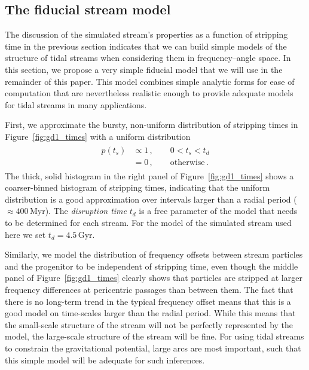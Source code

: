 \documentclass[12pt,preprint]{aastex}
\renewcommand{\figurename}{Figure}
\newcommand{\Myr}{\ensuremath{\,\mathrm{Myr}}}
\newcommand{\Gyr}{\ensuremath{\,\mathrm{Gyr}}}
\newcommand{\ts}{\ensuremath{t_s}}
\begin{document}
\subsection{The fiducial stream model}\label{sec:fidmodel}

The discussion of the simulated stream's properties as a function of
stripping time in the previous section indicates that we can build
simple models of the structure of tidal streams when considering them
in frequency--angle space. In this section, we propose a very simple
fiducial model that we will use in the remainder of this paper. This
model combines simple analytic forms for ease of computation that are
nevertheless realistic enough to provide adequate models for tidal
streams in many applications.

First, we approximate the bursty, non-uniform distribution of
stripping times in \figurename~\ref{fig:gd1_times} with a uniform
distribution
\begin{align}\label{eq:pt}
  \begin{split}
    p(\ts) & \propto 1\,,\qquad 0 < \ts < t_d\\
    & = 0\,,\qquad \mathrm{otherwise}\,.
  \end{split}
\end{align}
The thick, solid histogram in the right panel of
\figurename~\ref{fig:gd1_times} shows a coarser-binned histogram of
stripping times, indicating that the uniform distribution is a good
approximation over intervals larger than a radial period ($\approx
400\Myr$). The \emph{disruption time} $t_d$ is a free parameter of the
model that needs to be determined for each stream. For the model of
the simulated stream used here we set $t_d = 4.5\Gyr$.

Similarly, we model the distribution of frequency offsets between
stream particles and the progenitor to be independent of stripping
time, even though the middle panel of \figurename~\ref{fig:gd1_times}
clearly shows that particles are stripped at larger frequency
differences at pericentric passages than between them. The fact that
there is no long-term trend in the typical frequency offset means that
this is a good model on time-scales larger than the radial
period. While this means that the small-scale structure of the stream
will not be perfectly represented by the model, the large-scale
structure of the stream will be fine. For using tidal streams to
constrain the gravitational potential, large arcs are most important,
such that this simple model will be adequate for such inferences.
\end{document}
